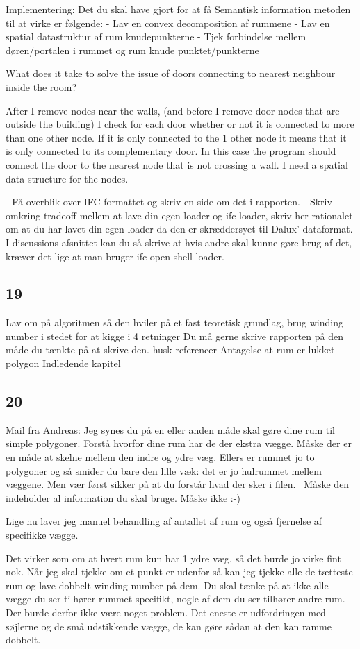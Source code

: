 Implementering:
Det du skal have gjort for at få Semantisk information metoden til at virke er følgende:
- Lav en convex decomposition af rummene
- Lav en spatial datastruktur af rum knudepunkterne
- Tjek forbindelse mellem døren/portalen i rummet og rum knude punktet/punkterne

What does it take to solve the issue of doors connecting to nearest neighbour inside the room?

After I remove nodes near the walls, (and before I remove door nodes that are outside the building) I check for each door whether or not it is connected to more than one other node. If it is only connected to the 1 other node it means that it is only connected to its complementary door. In this case the program should connect the door to the nearest node that is not crossing a wall. I need a spatial data structure for the nodes.


- Få overblik over IFC formattet og skriv en side om det i rapporten.
- Skriv omkring tradeoff mellem at lave din egen loader og ifc loader, skriv her rationalet om at du har lavet din egen loader da den er skræddersyet til Dalux' dataformat. I discussions afsnittet kan du så skrive at hvis andre skal kunne gøre brug af det, kræver det lige at man bruger ifc open shell loader.

\subsection{19}
Lav om på algoritmen så den hviler på et fast teoretisk grundlag, brug winding number i stedet for at kigge i 4 retninger
Du må gerne skrive rapporten på den måde du tænkte på at skrive den.
husk referencer
Antagelse at rum er lukket polygon
Indledende kapitel 

\subsection{20}
Mail fra Andreas:
Jeg synes du på en eller anden måde skal gøre dine rum til simple polygoner. Forstå hvorfor dine rum har de der ekstra vægge. Måske der er en måde at skelne mellem den indre og ydre væg. Ellers er rummet jo to polygoner og så smider du bare den lille væk: det er jo hulrummet mellem væggene. Men vær først sikker på at du forstår hvad der sker i filen.  Måske den indeholder al information du skal bruge. Måske ikke :-)

Lige nu laver jeg manuel behandling af antallet af rum og også fjernelse af specifikke vægge.

Det virker som om at hvert rum kun har 1 ydre væg, så det burde jo virke fint nok. 
Når jeg skal tjekke om et punkt er udenfor så kan jeg tjekke alle de tætteste rum og lave dobbelt winding number på dem. Du skal tænke på at ikke alle vægge du ser tilhører rummet specifikt, nogle af dem du ser tilhører andre rum. Der burde derfor ikke være noget problem. Det eneste er udfordringen med søjlerne og de små udstikkende vægge, de kan gøre sådan at den kan ramme dobbelt.
